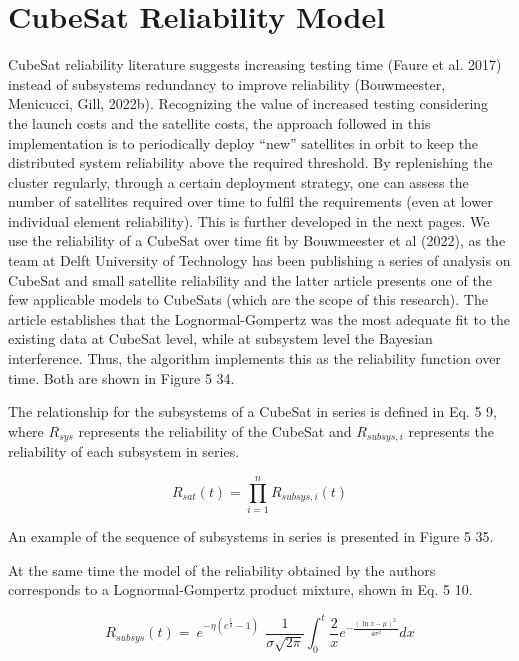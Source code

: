\section{CubeSat Reliability Model}

CubeSat reliability literature suggests increasing testing time (Faure et al. 2017) instead of subsystems redundancy to improve reliability (Bouwmeester, Menicucci, Gill, 2022b).
Recognizing the value of increased testing considering the launch costs and the satellite costs, the approach followed in this implementation is to periodically deploy “new” satellites in orbit to keep the distributed system reliability above the required threshold. By replenishing the cluster regularly, through a certain deployment strategy, one can assess the number of satellites required over time to fulfil the requirements (even at lower individual element reliability). This is further developed in the next pages.
We use the reliability of a CubeSat over time fit by Bouwmeester et al (2022), as the team at Delft University of Technology has been publishing a series of analysis on CubeSat and small satellite reliability and the latter article presents one of the few applicable models to CubeSats (which are the scope of this research). The article establishes that the Lognormal-Gompertz was the most adequate fit to the existing data at CubeSat level, while at subsystem level the Bayesian interference. Thus, the algorithm implements this as the reliability function over time. Both are shown in Figure 5 34.


The relationship for the subsystems of a CubeSat in series is defined in Eq. 5 9, where \(R_{sys}\)  represents the reliability of the CubeSat and \(R_{subsys,i}\) represents the reliability of each subsystem in series.

\[R_{sat}\left(t\right)=\prod_{i=1}^{n}{R_{subsys,i}(t)}\]

An example of the sequence of subsystems in series is presented in Figure 5 35.


At the same time the model of the reliability obtained by the authors corresponds to a Lognormal-Gompertz product mixture, shown in Eq. 5 10.

\[R_{subsys}\left(t\right)=\ e^{-\eta\left(e^\frac{t}{\theta}-1\right)\ }\ \frac{1}{\sigma\sqrt{2\pi}}\int_{0}^{t}\frac{2}{x}e^{-\frac{{(\ln{x}-\mu)}^2\ }{4\sigma^2}}dx\]

